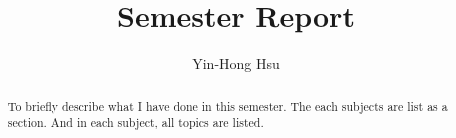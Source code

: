 \documentclass[journal]{IEEEtran}
\begin{document}
\title{Semester Report}


\author{Yin-Hong Hsu}

\maketitle
\begin{abstract}
	To briefly describe what I have done in this semester.
	The each subjects are list as a section. And in each subject, all topics are listed.      
\end{abstract}





%
\IEEEpeerreviewmaketitle
\end{document}
